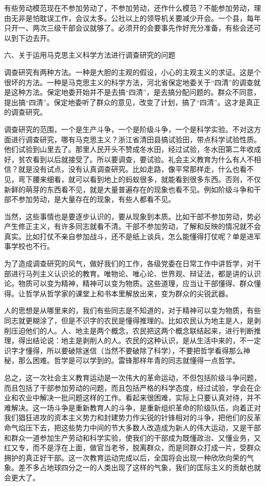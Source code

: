 有些劳动模范现在不参加劳动了，不参加劳动，还作什么模范？不能参加劳动，理由无非是怕耽误工作，会议太多。公社以上的领导机关要减少开会。一个县，每年只开一、两次三级干部会议就够了。必须开的会要事先作好充分准备，有些会还可以到下边去开。

六、关于运用马克思主义科学方法进行调查研究的问题

调查研究有两种方法。一种是大胆的主观的假设，小心的主观主义的求证。这是个很坏的方法。一种是马克思主义的科学方法，河北省保定地委关于“四清”的调查就是这种方法。保定地委开始并不是去搞“四清”，是去搞分配问题的。群众不同意，提出搞“四清”。保定地委听了群众的意见，改变了计划，搞了“四清”。这才是真正的调查研究。

调查研究的范围，一个是生产斗争，一个是阶级斗争，一个是科学实验。不对这方面进行调查研究，哪有马克思主义？浙江省清田县搞试验田，带点科学试验性质。他们试验到山里去了。那里人民开头不赞成冬水田，经过试验，冬水田第二年收成好，贫农看到以后就接受了。所以要调查，要试验。礼会主义教育为什么有人不相信？就是没有试点，没有认真调查研究。比如走路，像平常那样走，什么也看不见，弯下腰来细看，就可以看到地上的蚂蚁很多，就能看到很多东西。否则，不仅新鲜的萌芽的东西看不见，就是大量普遍存在的现象也看不见。例如阶级斗争和干部不参加劳动，是大量存在的现象，有些人都看不见。

当然，这些事情也是要逐步认识的，要从现象到本质。比如干部不参加劳动，势必产生修正主义，有许多同志就看不清。干部不参加劳动，了解和反映的情况就不会真实。比如打仗不亲自参加战斗，还不是纸上谈兵，怎么能懂得打仗呢？单是进军事学校也不行。

为了造成调查研究的风气，做好我们的工作，各级党委在日常工作中讲哲学，对干部进行马列主义认识论的教育。唯物论、唯心论、世界观、辩证法，都是讲的认识论。物质可以变为精神，精神可以变为物质。这些道理，应当让干部懂得、群众懂得。让哲学从哲学家的课堂上和书本里解放出来，变为群众的尖锐武器。

人的思想是从哪里来的，我们有些同志是不知道的，对于精神可以变为物质，有些同志就更糊涂了，但是不识字的农民是懂得推理的。比如农民认为地主是人，是剥削压迫他们的人。人、地主是两个概念，农民把这两个概念联结起来，进行判断推理，得出结论说：地主是剥削人的人。农民的这种认识，是从生活中来的，不一定识字才懂得，所以要破除迷信（当然不要破除了科学），不要把哲学看得那么神秘，那么困难。哲学是可以学到的。雷锋那样年青的同志就懂得一点哲学。

总之，这一次社会主义教育运动是一次伟大的革命运动，不但包括阶级斗争问题，而且包括了干部参加劳动的问题，而且包括严格的科学态度，经过试验，学会在企业和农业中解决一批问题这样的工作。看起来很困难，实际上只要认真对待，并不难解决。这一场斗争是重新教育人的斗争，是重新组织革命的阶级队伍，向着正对我们猖狂进攻的资本主义势力和封建势力作尖锐的针锋相对的斗争，把他们的反革命气焰压下去，把这些势力中间的节大多数人改造成为新人的伟大运动，又是干部和群众一道参加生产劳动和科学实验，使我们的干部成为既懂政治、又懂业务，又红又专，而不是浮在上面，做官当老爷，脱离群众，而是同群众打成一片，受群众拥护的真正好干部。这一次教育运动完成以后，全国将会出现一种欣欣向荣的气象。差不多占地球四分之一的人类出现了这样的气象，我们的匡际主义的贡献也就会更大了。


